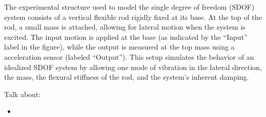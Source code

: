 \documentclass{article}  %
\begin{document}
The experimental structure used to model the single degree of freedom (SDOF) system consists of a vertical flexible rod rigidly fixed at its base. At the top of the rod, a small mass is attached, allowing for lateral motion when the system is excited. The input motion is applied at the base (as indicated by the “Input” label in the figure), while the output is measured at the top mass using a acceleration sensor (labeled “Output”). This setup simulates the behavior of an idealized SDOF system by allowing one mode of vibration in the lateral direction, the mass, the flexural stiffness of the rod, and the system's inherent damping.




\newpage
Talk about:

\begin{itemize}
  \item 
\end{itemize}
\end{document}
